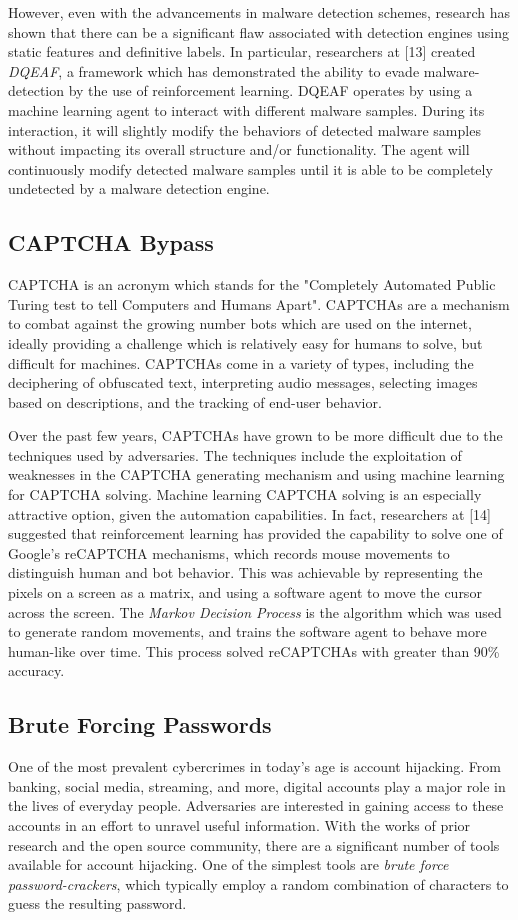 \documentclass[11pt,conference]{IEEEtran}
\begin{document}
However, even with the advancements in malware detection schemes, research
has shown that there can be a significant flaw associated with detection
engines using static features and definitive labels. In particular, researchers
at [13] created \emph{DQEAF}, a framework which has demonstrated the ability to evade malware-detection by
the use of reinforcement learning. DQEAF operates by using a machine
learning agent to interact with different malware samples. During its
interaction, it will slightly modify the behaviors of detected malware samples
without impacting its overall structure and/or functionality. The agent will
continuously modify detected malware samples until it is able to be completely
undetected by a malware detection engine.

\subsection{CAPTCHA Bypass}
CAPTCHA is an acronym which stands for the "Completely Automated Public Turing test
to tell Computers and Humans Apart". CAPTCHAs are a 
mechanism to combat against the growing number bots which are used on the
internet, ideally providing a challenge which is relatively easy for humans to
solve, but difficult for machines. CAPTCHAs come in a variety of types,
including the deciphering of obfuscated text, interpreting audio messages,
selecting images based on descriptions, and the tracking of end-user behavior.

Over the past few years, CAPTCHAs have grown to be more difficult due to the
techniques used by adversaries. The techniques include the exploitation of
weaknesses in the CAPTCHA generating mechanism
and using machine learning for CAPTCHA solving. Machine learning
CAPTCHA solving is an especially attractive option, given the automation
capabilities. In fact, researchers at [14] suggested that reinforcement learning has
provided the capability to solve one of Google's reCAPTCHA mechanisms, which
records mouse movements to distinguish human and bot behavior. This was
achievable by representing the pixels on a screen as a matrix, and using a
software agent to move the
cursor across the screen. The \emph{Markov
Decision Process} is the algorithm which was used to generate random movements,
and trains the software agent to behave more human-like over time. This
process solved reCAPTCHAs with greater than 90\% accuracy.

\subsection{Brute Forcing Passwords}
One of the most prevalent cybercrimes in today's age is account hijacking. From
banking, social media, streaming, and more, digital accounts play a major role
in the lives of everyday people. Adversaries are interested in
gaining access to these accounts in an effort to unravel useful information.
With the works of prior research and the open source community, there are a
significant number of tools available for account hijacking. One of the
simplest tools are \emph{brute force password-crackers}, which typically employ a random
combination of characters to guess the resulting password.
\end{document}
